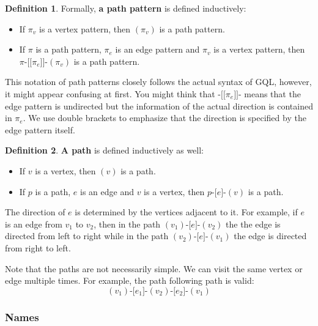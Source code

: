 \documentclass[14pt]{constructor-thesis}
\theoremstyle{definition}
\newtheorem{definition}{Definition}
\newcommand{\pathstart}[1]{(#1)}
\newcommand{\pathhop}[3]{#1 \texttt{-[} #2 \texttt{]-} (#3)}
\newcommand{\patternstart}[1]{(#1)}
\newcommand{\patternhop}[3]{#1 \texttt{-[[} #2 \texttt{]]-} (#3)}
\begin{document}

\begin{definition}
  Formally, \textbf{a path pattern} is defined inductively:
  \begin{itemize}
    \item If $\pi_v$ is a vertex pattern, then $\patternstart{\pi_v}$ is a path pattern.
    \item If $\pi$ is a path pattern, $\pi_e$ is an edge pattern and $\pi_v$ is a vertex pattern, then $\patternhop{\pi}{\pi_e}{\pi_v}$ is a path pattern.
  \end{itemize}
\end{definition}

This notation of path patterns closely follows the actual syntax of GQL, however, it might appear confusing at first. You might think that $\texttt{-[[} \pi_e \texttt{]]-}$ means that the edge pattern is undirected but the information of the actual direction is contained in $\pi_e$. We use double brackets to emphasize that the direction is specified by the edge pattern itself.

\begin{definition}
  \textbf{A path} is defined inductively as well:
  \begin{itemize}
    \item If $v$ is a vertex, then $\pathstart{v}$ is a path.
    \item If $p$ is a path, $e$ is an edge and $v$ is a vertex, then $\pathhop{p}{e}{v}$ is a path.
  \end{itemize}
\end{definition}

The direction of $e$ is determined by the vertices adjacent to it. For example, if $e$ is an edge from $v_1$ to $v_2$, then in the path $\pathhop{\pathstart{v_1}}{e}{v_2}$ the the edge is directed from left to right while in the path $\pathhop{\pathstart{v_2}}{e}{v_1}$ the edge is directed from right to left.

Note that the paths are not necessarily simple. We can visit the same vertex or edge multiple times. For example, the path following path is valid:
$$\pathhop{\pathhop{\pathstart{v_1}}{e_1}{v_2}}{e_2}{v_1}$$

\subsubsection{Names}
\label{sec:GQL-names}
\end{document}
